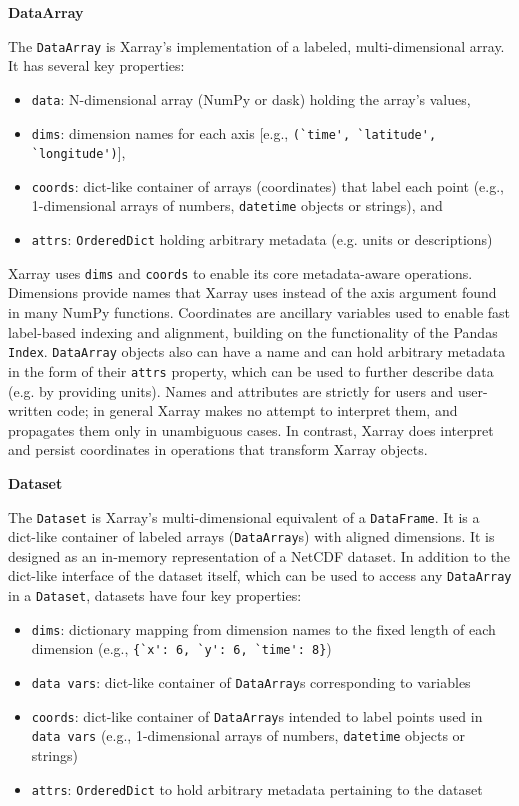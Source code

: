 \documentclass{jors}
\begin{document}
\textbf{DataArray}

The \verb|DataArray| is Xarray's implementation of a labeled, multi-dimensional array. It has several key properties:

\begin{itemize}
	\item \verb|data|: N-dimensional array (NumPy or dask) holding the array's values,
	\item \verb|dims|: dimension names for each axis [e.g., \verb|(`time', `latitude', `longitude')|],
	\item \verb|coords|: dict-like container of arrays (coordinates) that label each point (e.g., 1-dimensional arrays of numbers, \verb|datetime| objects or strings), and
	\item \verb|attrs|: \verb|OrderedDict| holding arbitrary metadata (e.g. units or descriptions)
\end{itemize}

Xarray uses \verb|dims| and \verb|coords| to enable its core metadata-aware operations.
Dimensions provide names that Xarray uses instead of the axis argument found in many NumPy functions.
Coordinates are ancillary variables used to enable fast label-based indexing and alignment, building on the functionality of the Pandas \verb|Index|.
\verb|DataArray| objects also can have a name and can hold arbitrary metadata in the form of their \verb|attrs| property, which can be used to further describe data (e.g. by providing units).
Names and attributes are strictly for users and user-written code; in general Xarray makes no attempt to interpret them, and propagates them only in unambiguous cases.
In contrast, Xarray does interpret and persist coordinates in operations that transform Xarray objects.

\textbf{Dataset}

The \verb|Dataset| is Xarray's multi-dimensional equivalent of a \verb|DataFrame|. It is a dict-like container of labeled arrays (\verb|DataArray|s) with aligned dimensions.
It is designed as an in-memory representation of a NetCDF dataset.
In addition to the dict-like interface of the dataset itself, which can be used to access any \verb|DataArray| in a \verb|Dataset|, datasets have four key properties:

\begin{itemize}
	\item \verb|dims|: dictionary mapping from dimension names to the fixed length of each dimension (e.g., \verb|{`x': 6, `y': 6, `time': 8}|)
	\item \verb|data vars|: dict-like container of \verb|DataArray|s corresponding to variables
	\item \verb|coords|: dict-like container of \verb|DataArray|s intended to label points used in \verb|data vars| (e.g., 1-dimensional arrays of numbers, \verb|datetime| objects or strings)
	\item \verb|attrs|: \verb|OrderedDict| to hold arbitrary metadata pertaining to the dataset
\end{itemize}
\end{document}

